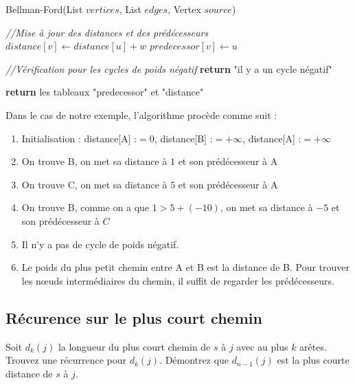 \begin{solution}
\begin{algorithm}{Bellman-Ford(List $vertices$, List $edges$, Vertex $source$)}
\begin{algorithmic}
				\medskip
				\STATE \textit{//Mise à jour des distances et des prédécesseurs}
							\STATE $distance[v] \leftarrow distance[u] + w$
							\STATE $predecessor[v] \leftarrow u$
						\ENDIF
					\ENDFOR
				\ENDFOR

				\medskip
				\STATE \textit{//Vérification pour les cycles de poids négatif}
						\STATE \textbf{return} "il y a un cycle négatif"
					\ENDIF
				\ENDFOR
				\medskip

				\STATE \textbf{return} les tableaux "predecessor" et "distance"
			\end{algorithmic}
		\end{algorithm}

		Dans le cas de notre exemple, l'algorithme procède comme suit :
		\begin{enumerate}
			\item Initialisation : distance[A] :$= 0$, distance[B] :$= +\infty$, distance[A] :$= +\infty$
			\item On trouve B, on met sa distance à $1$ et son prédécesseur à A
			\item On trouve C, on met sa distance à $5$ et son prédécesseur à A
			\item On trouve B, comme on a que $1>5+(-10)$, on met sa distance à $-5$ et son prédécesseur à $C$
			\item Il n'y a pas de cycle de poids négatif.
			\item Le poids du plus petit chemin entre A et B est la distance de B. Pour trouver les nœuds intermédiaires du chemin, il suffit de regarder les prédécesseurs.
		\end{enumerate}
\end{solution}

\subsection{Récurence sur le plus court chemin} Soit $d_k(j)$ la longueur du plus court chemin de $s$ à $j$ avec au plus $k$ arêtes. Trouvez une récurrence pour $d_k(j)$. Démontrez que $d_{n-1}(j)$ est la plus courte distance de $s$ à $j$.

